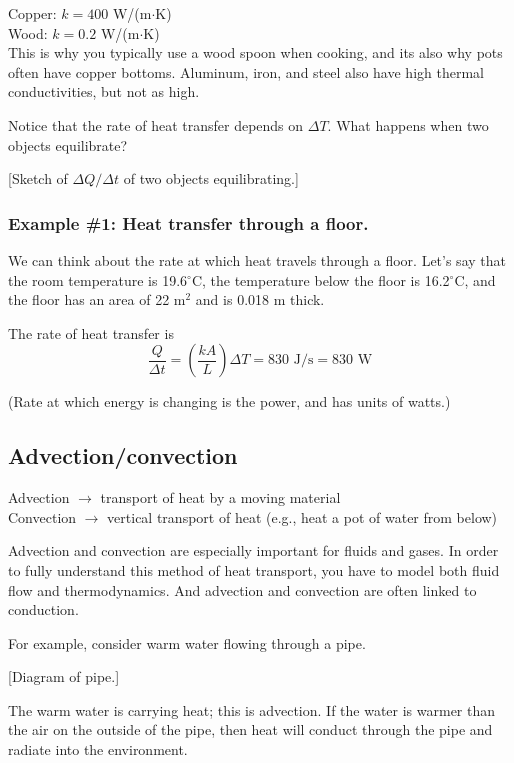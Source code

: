 Copper: $k=400$ W/(m$\cdot$K)\\
Wood: $k=0.2$ W/(m$\cdot$K)\\

This is why you typically use a wood spoon when cooking, and its also why pots often have copper bottoms. Aluminum, iron, and steel also have high thermal conductivities, but not as high. 

Notice that the rate of heat transfer depends on $\Delta{T}$. What happens when two objects equilibrate?

[Sketch of $\Delta{Q}/\Delta{t}$ of two objects equilibrating.]
\vspace{5cm}

\subsubsection{Example \#1: Heat transfer through a floor.}
We can think about the rate at which heat travels through a floor. Let's say that the room temperature is 19.6$^\circ$C, the temperature below the floor is 16.2$^\circ$C, and the floor has an area of 22 m$^2$ and is 0.018 m thick.

The rate of heat transfer is 
$$\frac{Q}{\Delta{t}}=\left(\frac{kA}{L}\right)\Delta{T}=830\mbox{ J/s}=830\mbox{ W}$$

(Rate at which energy is changing is the power, and has units of watts.)

\subsection{Advection/convection}
Advection $\rightarrow$ transport of heat by a moving material\\
Convection $\rightarrow$ vertical transport of heat (e.g., heat a pot of water from below)

Advection and convection are especially important for fluids and gases. In order to fully understand this method of heat transport, you have to model both fluid flow and thermodynamics. And advection and convection are often linked to conduction.

For example, consider warm water flowing through a pipe.

[Diagram of pipe.]\nopagebreak
\vspace{4cm}

The warm water is carrying heat; this is advection. If the water is warmer than the air on the outside of the pipe, then heat will conduct through the pipe and radiate into the environment.

